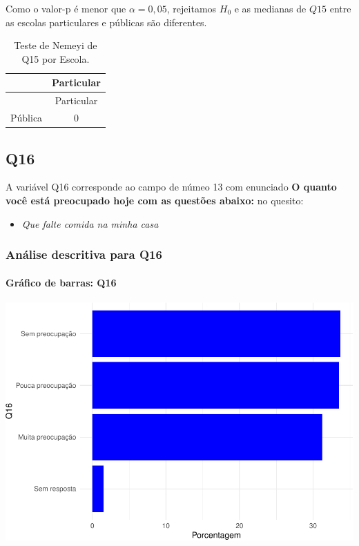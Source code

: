\documentclass[]{article}
\providecommand{\tightlist}{%
  \setlength{\itemsep}{0pt}\setlength{\parskip}{0pt}}
\let\oldparagraph\paragraph
\renewcommand{\paragraph}[1]{\oldparagraph{#1}\mbox{}}
\begin{document}
Como o valor-p é menor que \(\alpha=0,05\), rejeitamos \(H_0\) e as medianas de \(Q15\) entre as escolas particulares e públicas são diferentes.

\begin{longtable}[]{@{}lc@{}}
\caption{\label{tab:unnamed-chunk-132}Teste de Nemeyi de Q15 por Escola.}\tabularnewline
\toprule
& Particular\tabularnewline
\midrule
\endfirsthead
\toprule
& Particular\tabularnewline
\midrule
\endhead
Pública & 0\tabularnewline
\bottomrule
\end{longtable}

\cleardoublepage

\hypertarget{q16}{%
\subsection{Q16}\label{q16}}

A variável Q16 corresponde ao campo de númeo 13 com enunciado \textbf{O quanto você está preocupado hoje com as questões abaixo:} no quesito:

\begin{itemize}
\tightlist
\item
  \emph{Que falte comida na minha casa}
\end{itemize}

\hypertarget{anuxe1lise-descritiva-para-q16}{%
\subsubsection{Análise descritiva para Q16}\label{anuxe1lise-descritiva-para-q16}}

\hypertarget{gruxe1fico-de-barras-q16}{%
\paragraph{Gráfico de barras: Q16}\label{gruxe1fico-de-barras-q16}}

\begin{center}\includegraphics[width=0.75\linewidth]{relatorio_files/figure-latex/unnamed-chunk-133-1} \end{center}
\end{document}
